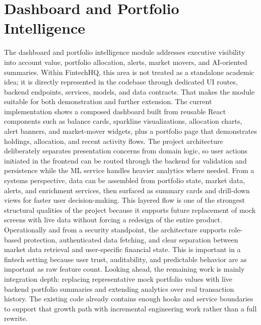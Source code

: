 \documentclass[11pt,a4paper]{article}
\begin{document}
\section{Dashboard and Portfolio Intelligence}
The dashboard and portfolio intelligence module addresses executive visibility into account value, portfolio allocation, alerts, market movers, and AI-oriented summaries. Within FintechHQ, this area is not treated as a standalone academic idea; it is directly represented in the codebase through dedicated UI routes, backend endpoints, services, models, and data contracts. That makes the module suitable for both demonstration and further extension. The current implementation shows a composed dashboard built from reusable React components such as balance cards, sparkline visualizations, allocation charts, alert banners, and market-mover widgets, plus a portfolio page that demonstrates holdings, allocation, and recent activity flows. The project architecture deliberately separates presentation concerns from domain logic, so user actions initiated in the frontend can be routed through the backend for validation and persistence while the ML service handles heavier analytics where needed. From a systems perspective, data can be assembled from portfolio state, market data, alerts, and enrichment services, then surfaced as summary cards and drill-down views for faster user decision-making. This layered flow is one of the strongest structural qualities of the project because it supports future replacement of mock screens with live data without forcing a redesign of the entire product. Operationally and from a security standpoint, the architecture supports role-based protection, authenticated data fetching, and clear separation between market data retrieval and user-specific financial state. This is important in a fintech setting because user trust, auditability, and predictable behavior are as important as raw feature count. Looking ahead, the remaining work is mainly integration depth: replacing representative mock portfolio values with live backend portfolio summaries and extending analytics over real transaction history. The existing code already contains enough hooks and service boundaries to support that growth path with incremental engineering work rather than a full rewrite.
\end{document}
